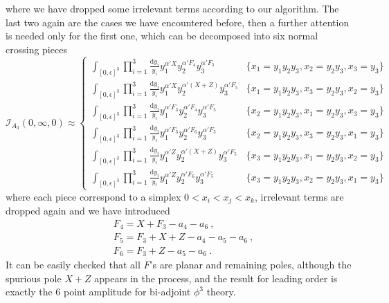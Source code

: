 \documentclass[12pt]{article}
\theoremstyle{definition}
\theoremstyle{plain}
\newcommand{\dif}{\mathrm{d}} %
\begin{document}
where we have dropped some irrelevant terms according to our algorithm. The last two again are the cases we have encountered before, then a further attention is needed only for the first one, which can be decomposed into six normal crossing pieces 
\begin{equation*}
	\mathcal{I}_{A_{3}}(0,\infty,0)\approx
	\begin{cases}
		\int_{[0,\epsilon]^{3}}\prod_{i=1}^{3}\frac{\dif y_{i}}{y_{i}} y_{1}^{\alpha'X} y_{2}^{\alpha' F_{4}}
		y_{3}^{\alpha'F_{5} }  & \{x_{1}=y_{1}y_{2}y_{3}, x_{2}=y_{2}y_{3},x_{3}=y_{3}\} \\
		\int_{[0,\epsilon]^{3}}\prod_{i=1}^{3}\frac{\dif y_{i}}{y_{i}} y_{1}^{\alpha'X} y_{2}^{\alpha' (X+Z)}
		y_{3}^{\alpha'F_{5} }  & \{x_{1}=y_{1}y_{2}y_{3}, x_{3}=y_{2}y_{3},x_{2}=y_{3}\}  \\
		\int_{[0,\epsilon]^{3}}\prod_{i=1}^{3}\frac{\dif y_{i}}{y_{i}} y_{1}^{\alpha' F_{3}} y_{2}^{\alpha' F_{4}}
		y_{3}^{\alpha'F_{5} }  & \{x_{2}=y_{1}y_{2}y_{3}, x_{1}=y_{2}y_{3},x_{3}=y_{3}\}  \\
		\int_{[0,\epsilon]^{3}}\prod_{i=1}^{3}\frac{\dif y_{i}}{y_{i}} y_{1}^{\alpha' F_{3}} y_{2}^{\alpha' F_{6}}
		y_{3}^{\alpha'F_{5} }  & \{x_{2}=y_{1}y_{2}y_{3}, x_{3}=y_{2}y_{3},x_{1}=y_{3}\}  \\
		\int_{[0,\epsilon]^{3}}\prod_{i=1}^{3}\frac{\dif y_{i}}{y_{i}} y_{1}^{\alpha' Z} y_{2}^{\alpha' (X+Z)}
		y_{3}^{\alpha'F_{5} }  & \{x_{3}=y_{1}y_{2}y_{3}, x_{1}=y_{2}y_{3},x_{2}=y_{3}\}  \\
		\int_{[0,\epsilon]^{3}}\prod_{i=1}^{3}\frac{\dif y_{i}}{y_{i}} y_{1}^{\alpha' Z} y_{2}^{\alpha' F_{6}}
		y_{3}^{\alpha'F_{5} }  & \{x_{3}=y_{1}y_{2}y_{3}, x_{2}=y_{2}y_{3},x_{1}=y_{3}\}  
	\end{cases}
\end{equation*}
where each piece correspond to a simplex $0<x_{i}<x_{j}<x_{k}$, irrelevant terms are dropped again and we have introduced
\begin{align*}
	&F_{4}=X+F_{3}-a_{4}-a_{6} \:, \\
	&F_{5}=F_{3}+X+Z-a_{4}-a_{5}-a_{6} \:, \\
	&F_{6}=F_{3}+Z-a_{5}-a_{6} \:.
\end{align*}
It can be easily checked that all $F$'s are planar and remaining poles, although the spurious pole $X+Z$ appears in the process, and the result for leading order is exactly the 6 point amplitude for bi-adjoint $\phi^{3}$ theory.
\end{document}
